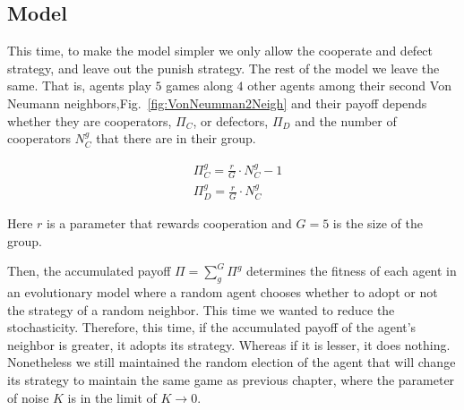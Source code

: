 \subsection{Model}

This time, to make the model simpler we only allow the cooperate and defect strategy, and leave out the punish strategy. The rest of the model we leave the same. That is, agents play $5$ games along $4$ other agents among their second Von Neumann neighbors,Fig.~\ref{fig:VonNeumman2Neigh} and their payoff depends whether they are cooperators, $\Pi_C$, or defectors, $\Pi_D$ and the number of cooperators $N_C^g$ that there are in their group.

\begin{equation}
    \begin{split}
    	&\Pi_C^g=\frac{r}{G}\cdot N_C^g-1 \\
    	&\Pi_D^g=\frac{r}{G}\cdot N_C^g
    \end{split}    
\end{equation}

Here $r$ is a parameter that rewards cooperation and $G = 5$ is the size of the group.

Then, the accumulated payoff $\Pi=\sum_g^G \Pi^g$ determines the fitness of each agent in an evolutionary model where a random agent chooses whether to adopt or not the strategy of a random neighbor. This time we wanted to reduce the stochasticity. Therefore, this time, if the accumulated payoff of the agent's neighbor is greater, it adopts its strategy. Whereas if it is lesser, it does nothing. Nonetheless we still maintained the random election of the agent that will change its strategy to maintain the same game as previous chapter, where the parameter of noise $K$ is in the limit of $K \to 0$.


